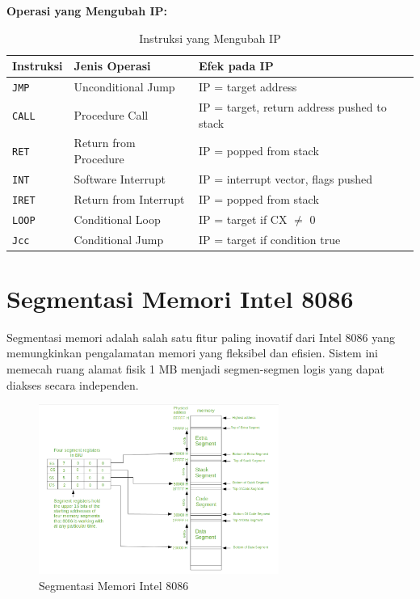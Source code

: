 \documentclass[../main.tex]{subfiles}
\begin{document}
\textbf{Operasi yang Mengubah IP:}
\begin{table}[h]
\centering
\caption{Instruksi yang Mengubah IP}
\begin{tabular}{|p{3cm}|p{4cm}|p{8cm}|}
\hline
\textbf{Instruksi} & \textbf{Jenis Operasi} & \textbf{Efek pada IP} \\
\hline
\texttt{JMP} & Unconditional Jump & IP = target address \\
\hline
\texttt{CALL} & Procedure Call & IP = target, return address pushed to stack \\
\hline
\texttt{RET} & Return from Procedure & IP = popped from stack \\
\hline
\texttt{INT} & Software Interrupt & IP = interrupt vector, flags pushed \\
\hline
\texttt{IRET} & Return from Interrupt & IP = popped from stack \\
\hline
\texttt{LOOP} & Conditional Loop & IP = target if CX $\neq$ 0 \\
\hline
\texttt{Jcc} & Conditional Jump & IP = target if condition true \\
\hline
\end{tabular}
\label{tab:ip-modifying-instructions}
\end{table}

\section{Segmentasi Memori Intel 8086}
Segmentasi memori adalah salah satu fitur paling inovatif dari Intel 8086 yang memungkinkan pengalamatan memori yang fleksibel dan efisien. Sistem ini memecah ruang alamat fisik 1 MB menjadi segmen-segmen logis yang dapat diakses secara independen.

\begin{figure}[h]
\centering
\includegraphics[width=0.7\textwidth]{../images/8086_memory_segmentation.png}
\caption{Segmentasi Memori Intel 8086}
\label{fig:8086-memory-segmentation}
\end{figure}
\end{document}
